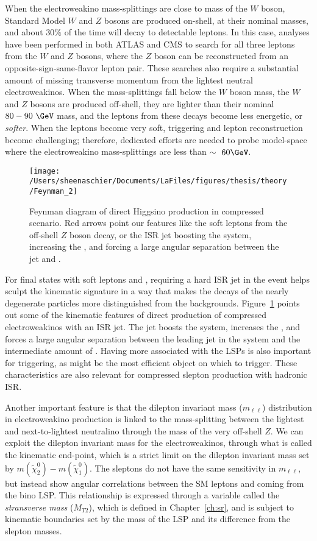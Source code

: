 When the electroweakino mass-splittings are close to mass of the $W$ boson, Standard Model $W$ and $Z$ bosons are produced on-shell, at their nominal masses, and about $30\%$ of the time will decay to detectable leptons.  In this case, analyses have been performed in both ATLAS and CMS to search for all three leptons from the $W$ and $Z$ bosons, where the $Z$ boson can be reconstructed from an opposite-sign-same-flavor lepton pair.  These searches also require a substantial amount of missing transverse momentum from the lightest neutral electroweakinos.  When the mass-splittings fall below the $W$ boson mass, the $W$ and $Z$ bosons are produced off-shell, they are lighter than their nominal $80-90~\GeV$ mass, and the leptons from these decays become less energetic, or \textit{softer}.  When the leptons become very soft, triggering and lepton reconstruction become challenging; therefore, dedicated efforts are needed to probe model-space where the electroweakino mass-splittings are less than $\sim~60\GeV$. 
   \begin{figure}%
  \begin{center}
  \texttt{[image: /Users/sheenaschier/Documents/LaFiles/figures/thesis/theory/Feynman\_2]}
   \end{center}
 \caption{Feynman diagram of direct Higgsino production in compressed scenario.  Red arrows point our features like the soft leptons from the off-shell $Z$ boson decay, or the ISR jet boosting the system, increasing the \met, and forcing a large angular separation between the jet and \met.}
 \label{fig:fn3}
 \end{figure}
For final states with soft leptons and \met{}, requiring a hard ISR jet in the event helps sculpt the kinematic signature in a way that makes the decays of the nearly degenerate particles more distinguished from the backgrounds.  Figure~\ref{fig:fn3} points out some of the kinematic features of direct production of compressed electroweakinos with an ISR jet.   The jet boosts the system, increases the \met, and forces a large angular separation between the leading jet in the system and the intermediate amount of \met.  Having more \met associated with the LSPs is also important for triggering, as \met might be the most efficient object on which to trigger.  These characteristics are also relevant for compressed slepton production with hadronic ISR.  

Another important feature is that the dilepton invariant mass ($m_{\ell\ell}$) distribution in electroweakino production is linked to the mass-splitting between the lightest and next-to-lightest neutralino through the mass of the very off-shell $Z$.  We can exploit the dilepton invariant mass for the electroweakinos, through what is called the kinematic end-point, which is a strict limit on the dilepton invariant mass set by $m(\tilde\chi_2^0)-m(\tilde\chi_1^0)$. The sleptons do not have the same sensitivity in $m_{\ell\ell}$, but instead show angular correlations between the SM leptons and \met{} coming from the bino LSP.  This relationship is expressed through a variable called the \textit{stransverse mass} ($M_{T2}$), which is defined in Chapter~\ref{ch:sr}, and is subject to kinematic boundaries set by the mass of the LSP and its difference from the slepton masses.

